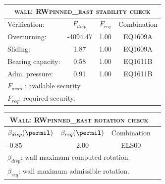 \begin{center}
\begin{tabular}[H]{|l|c|c|c|}
\hline
\multicolumn{4}{|c|}{\textsc{wall: RWpinned_east stability check}}\\
\hline
Vérification:  & $F_{disp}$ & $F_{req}$ & Combination\\
\hline
Overturning:  & -4094.47 & 1.00 & EQ1609A\\
Sliding:  & 1.87 & 1.00 & EQ1609A\\
Bearing capacity:  & 0.58 & 1.00 & EQ1611B\\
Adm. pressure:  & 0.91 & 1.00 & EQ1611B\\
\hline
\multicolumn{4}{|l|}{$F_{avail.}$: available security.}\\
\multicolumn{4}{|l|}{$F_{req}$: required security.}\\
\hline
\end{tabular}
\end{center}
\begin{center}
\begin{tabular}[H]{|l|c|c|c|}
\hline
\multicolumn{3}{|c|}{\textsc{Wall: RWpinned_east rotation check}}\\
\hline
$\beta_{disp} (\permil)$ & $\beta_{req}(\permil)$ & Combination\\
\hline
-0.85 & 2.00 & ELS00\\
\hline
\multicolumn{3}{|l|}{$\beta_{disp}$: wall maximum computed rotation.}\\
\multicolumn{3}{|l|}{$\beta_{req}$: wall maximum admissible rotation.}\\
\hline
\end{tabular}
\end{center}
 \label{tb_RWpinned_east}
\tablelasttail{\hline}
